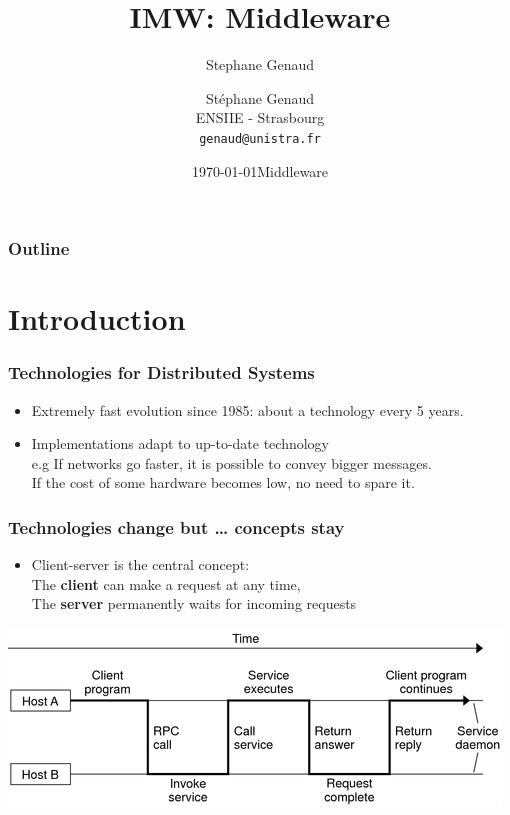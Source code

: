 \documentclass[bigger,hyperref={colorlinks=true, urlcolor=red, plainpages=false, pdfpagelabels, bookmarksnumbered}]{beamer}
\title{IMW: Middleware}
\author{Stephane Genaud}
\date{\today}
\author[S. Genaud]{{\large Stéphane Genaud} \\ \vspace{0.2cm} ENSIIE - Strasbourg \\ \vspace{0.2cm} \texttt{genaud@unistra.fr} }
\date{{\large Middleware} \\ \vspace{0.2cm} }
\begin{document}
\maketitle

\begin{frame}
\frametitle{Outline}
\setcounter{tocdepth}{3}
\tableofcontents
\end{frame}









\section{Introduction}
\label{sec-1}
\begin{frame}
\frametitle{Technologies for Distributed Systems}
\label{sec-1-1}

\begin{itemize}
\item Extremely fast evolution since 1985:
     about a technology every 5 years.\\
\item Implementations adapt to up-to-date technology\\
e.g If networks go faster, it is possible to convey bigger messages.\\
         If the cost of some hardware becomes low, no need to spare it.
\end{itemize}
\end{frame}
\begin{frame}
\frametitle{Technologies change but \ldots{} concepts stay}
\label{sec-1-2}

\begin{itemize}
\item Client-server is the central concept:\\
The \textbf{client} can make a request at any time,\\
      The \textbf{server} permanently waits for incoming requests
\end{itemize}
\includegraphics[width=.9\linewidth]{./img/S9_RPC_works.png}
\end{frame}
\end{document}
